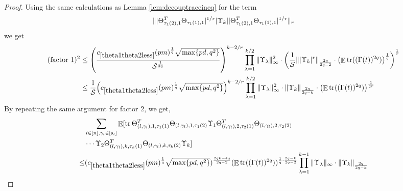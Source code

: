 \documentclass[11pt]{amsart}
\numberwithin{equation}{section}
\numberwithin{equation}{section}
\DeclareMathOperator{\E}{\mathbb{E}}
\DeclareMathOperator*{\tr}{tr}
\newcommand{\cS}{\mathcal{S}}
\DeclarePairedDelimiter{\norm}{\lVert}{\rVert}
\DeclarePairedDelimiter{\paren}{(}{)}
\theoremstyle{remark}
\theoremstyle{definition}
\begin{document}
\begin{proof}
Using the same calculations as Lemma \ref{lem:decouptraceineq} for the term \begin{align*}
    \norm{|\Theta_{\tau_{1}(2),1}^T\Theta_{\tau_{1}(1),1}|^{1/r} |\Upsilon_k| |\Theta_{\tau_{1}(2),1}^T\Theta_{\tau_{1}(1),1}|^{1/r}}_r
\end{align*} we get
\begin{align*}
    (\text{factor 1})^2
 &\le  \paren*{\frac{ c_{\ref*{theta1theta2less}}(pm)^\frac{1}{q}\sqrt{\max \{pd, q^2 \}} }{\mathcal{S}^\frac{1}{2q}}}^{k-2/r}\prod\limits_{\lambda  = 1}^{k/2} {\norm{\Upsilon_\lambda }_{\infty}^2} \cdot  \paren*{\frac{1}{\cS} \norm{|\Upsilon_k|^{r}}_{\frac{2q}{2q-2}} \cdot \paren*{\E \tr((\Gamma(t))^{2q})}^\frac{1}{q}}^\frac{1}{r} \\
 &\le \frac{1}{\cS} \paren*{ c_{\ref*{theta1theta2less}}(pm)^\frac{1}{q}\sqrt{\max \{pd, q^2 \}}  }^{k-2/r}\prod\limits_{\lambda  = 1}^{k/2} {\norm{\Upsilon_\lambda }_{\infty}^2} \cdot   \norm{\Upsilon_k}_{\frac{2q}{2q-k}} \cdot \paren*{\E \tr((\Gamma(t))^{2q})}^\frac{1}{qr}  \\
\end{align*}
By repeating the same argument for factor 2, we get,
\begin{align*}
    &\sum_{l \in [n], \gamma_l \in [s_l]} \E[ \tr \Theta_{(l,\gamma_l), 1, \tau_1(1)}^T\Theta_{(l,\gamma_l), 1, \tau_1(2)}
	\Upsilon_1\Theta_{(l,\gamma_l), 2, \tau_2(1)}^T\Theta_{(l,\gamma_l), 2, \tau_2(2)} \\&\cdots
	\Upsilon_2\Theta_{(l,\gamma_l), k, \tau_k(1)}^T\Theta_{(l,\gamma_l), k, \tau_k(2)}\Upsilon_k]  \\ \le &
       (c_{\ref*{theta1theta2less}}(pm)^\frac{1}{q}\sqrt{\max\{pd,q^2\}})^{\frac{2qk-4q}{2q-2}} (\E \tr((\Gamma(t))^{2q}))^{\frac{1}{q} \cdot \frac{2q-k}{2q-2}} \prod\limits_{\lambda  = 1}^{k-1} {\norm{\Upsilon_\lambda }_{\infty}} \cdot \norm{\Upsilon_k}_{\frac{2q}{2q-k}}
\end{align*}
\end{proof}
\end{document}
